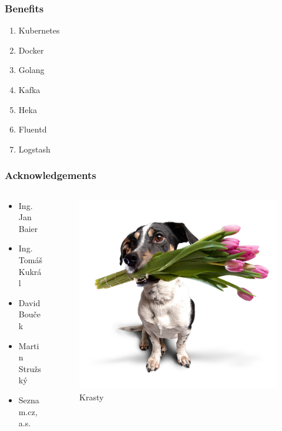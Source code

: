 		\begin{frame}
			\frametitle{Benefits}				
			\bigskip
			\begin{enumerate}
				\item Kubernetes
        \item Docker
				\item Golang
        \item Kafka
				\item Heka
        \item Fluentd
        \item Logstash
			\end{enumerate}
		\end{frame}

		\begin{frame}
			\frametitle{Acknowledgements}
      \begin{columns}
        \begin{column}{0.48\textwidth}
    			\begin{itemize}
    				\item Ing. Jan Baier 
    				\item Ing. Tomáš Kukrál
    				\item David Bouček
            \item Martin Stružský
            \item Seznam.cz, a.s. 
    			\end{itemize}
          \end{column}  
          \begin{column}{0.48\textwidth}
            \begin{figure}[htb]
    				  \begin{center}
    					  \includegraphics[width=\textwidth]{img/pes-krasty-seznam-13.png}
    					  \caption{Krasty \cite{krasty}}
    				  \end{center}
    			  \end{figure}
          \end{column}
        \end{columns}
		\end{frame}

